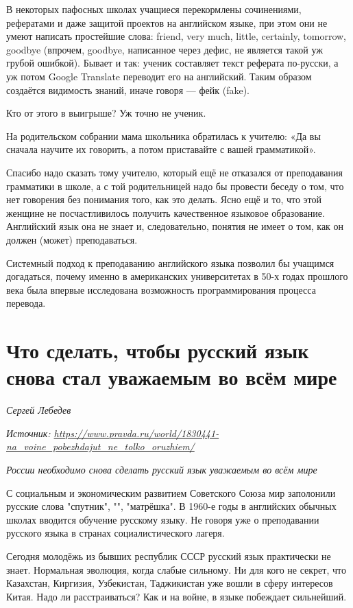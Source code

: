 В некоторых пафосных школах учащиеся перекормлены сочинениями, рефератами и даже защитой проектов на английском языке, при этом они не умеют написать простейшие слова: friend, very much, little, certainly, tomorrow, goodbye (впрочем, goodbye, написанное через дефис, не является такой уж грубой ошибкой). Бывает и так: ученик составляет текст реферата по-русски, а уж потом Google Translate переводит его на английский. Таким образом создаётся видимость знаний, иначе говоря — фейк (fake).

Кто от этого в выигрыше? Уж точно не ученик.

На родительском собрании мама школьника обратилась к учителю: «Да вы сначала научите их говорить, а потом приставайте с вашей грамматикой».

Спасибо надо сказать тому учителю, который ещё не отказался от преподавания грамматики в школе, а с той родительницей надо бы провести беседу о том, что нет говорения без понимания того, как это делать. Ясно ещё и то, что этой женщине не посчастливилось получить качественное языковое образование. Английский язык она не знает и, следовательно, понятия не имеет о том, как он должен (может) преподаваться.

Системный подход к преподаванию английского языка позволил бы учащимся догадаться, почему именно в американских университетах в 50-х годах прошлого века была впервые исследована возможность программирования процесса перевода.


\newpage
\section{Что сделать, чтобы русский язык снова стал уважаемым во всём мире}

\textit{Сергей Лебедев}

\textit{Источник: \url{https://www.pravda.ru/world/1830441-na_voine_pobezhdajut_ne_tolko_oruzhiem/}}

\textit{России необходимо снова сделать русский язык уважаемым во всём мире}

С социальным и экономическим развитием Советского Союза мир заполонили русские слова "спутник", "", "матрёшка". В 1960-е годы в английских обычных школах вводится обучение русскому языку. Не говоря уже о преподавании русского языка в странах социалистического лагеря.

Сегодня молодёжь из бывших республик СССР русский язык практически не знает. Нормальная эволюция, когда слабые  сильному. Ни для кого не секрет, что Казахстан, Киргизия, Узбекистан, Таджикистан уже вошли в сферу интересов Китая. Надо ли расстраиваться? Как и на войне, в языке побеждает сильнейший.

